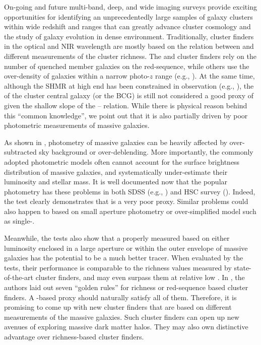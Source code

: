 \documentclass[fleqn,usenatbib,useAMS,english]{mnras}
\begin{document}
    On-going and future multi-band, deep, and wide imaging surveys provide exciting opportunities
    for identifying an unprecedentedly large samples of galaxy clusters within wide redshift and
    \mhalo{} ranges that can greatly advance cluster cosmology and the study of galaxy evolution
    in dense environment.
    Traditionally, cluster finders in the optical and NIR wavelength are mostly based on the 
    relation between \mvir{} and different measurements of the cluster richness.
    The \redm{} and \camira{} cluster finders rely on the number of quenched member galaxies
    on the red-sequence, while others use the over-density of galaxies within a narrow 
    photo-$z$ range (e.g., \citealt{Wen2021, Zou2021}).
    At the same time, although the SHMR at high \mstar{} end has been constrained in observation
    (e.g., \citealt{Leauthaud2012, Tinker2017, Kravtsov2018}), the \mstar{} of the cluster
    central galaxy (or the BCG) is still not considered a good proxy of \mvir{} given the shallow
    slope of the \mvir{}--\mstar{} relation.
    While there is physical reason behind this ``common knowledge'', we point out that it is also
    partially driven by poor photometric measurements of massive galaxies.
    
    As shown in \citet{Huang2018b}, photometry of massive galaxies can be heavily affected
    by over-subtracted sky background or over-deblending. 
    More importantly, the commonly adopted photometric models often cannot account for the
    surface brightness distribution of massive galaxies, and systematically under-estimate their
    luminosity and stellar mass.
    It is well documented now that the popular \cmodel{} photometry has these problems in both
    SDSS (e.g., \citealt{Bernardi2013}) and HSC survey (\citealt{Huang2018b}).
    Indeed, the \topn{} test clearly demonstrates that \mcmodel{} is a very poor \mvir{} proxy.
    Similar problems could also happen to \mstar{} based on small aperture photometry or 
    over-simplified model such as single-\ser{}.
    
    Meanwhile, the \topn{} tests also show that a properly measured \mstar{} based on either
    luminosity enclosed in a large aperture or within the outer envelope of massive galaxies has
    the potential to be a much better \mvir{} tracer.
    When evaluated by the \topn{} tests, their performance is comparable to the richness values
    measured by state-of-the-art cluster finders, and may even surpass them at relative low
    \mvir{}.
    In \citet{Rykoff2014}, the authors laid out seven ``golden rules'' for richness or 
    red-sequence based cluster finders.
    A \mstar{}-based \mvir{} proxy should naturally satisfy all of them.
    Therefore, it is promising to come up with new cluster finders that are based on different 
    \mstar{} measurements of the massive galaxies.
    Such cluster finders can open up new avenues of exploring massive dark matter halos.
    They may also own distinctive advantage over richness-based cluster finders.
    
\end{document}
